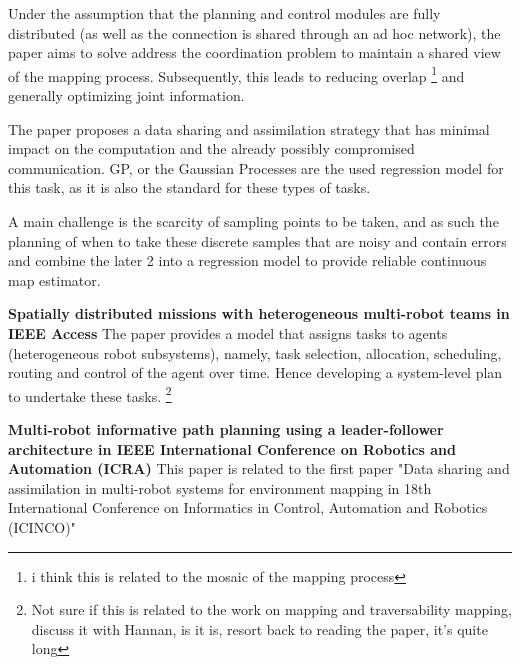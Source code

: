 \documentclass{article}
\begin{document}
Under the assumption that the planning and control modules are fully distributed (as well as the connection is shared through an ad hoc network), the paper aims to solve address the coordination problem to maintain a shared view of the mapping process. Subsequently, this leads to reducing overlap \footnote{i think this is related to the mosaic of the mapping process} and generally optimizing joint information. 

The paper proposes a data sharing and assimilation strategy that has minimal impact on the computation and the already possibly compromised communication. GP, or the Gaussian Processes are the used regression model for this task, as it is also the standard for these types of tasks. 

A main challenge is the scarcity of sampling points to be taken, and as such the planning of when to take these discrete samples that are noisy and contain errors and combine the later 2 into a regression model to provide reliable continuous map estimator. 

\vspace{5pt}

\textbf{Spatially distributed missions with heterogeneous multi-robot teams in IEEE Access}
The paper provides a model that assigns tasks to agents (heterogeneous robot subsystems), namely, task selection, allocation, scheduling, routing and control of the agent over time. Hence developing a system-level plan to undertake these tasks. \footnote{Not sure if this is related to the work on mapping and traversability mapping, discuss it with Hannan, is it is, resort back to reading the paper, it's quite long}

\vspace{20pt} 

\textbf{Multi-robot informative path planning using a leader-follower architecture in IEEE International Conference on Robotics and Automation (ICRA)}
This paper is related to the first paper "Data sharing and assimilation in multi-robot systems for environment mapping in 18th International Conference on Informatics in Control, Automation and Robotics (ICINCO)"

\vspace{5pt}
\end{document}
